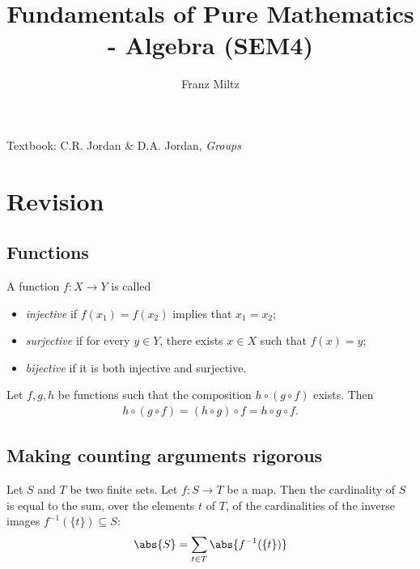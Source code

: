 \documentclass{article}
\begin{document}
\mkfpmthms
\title{Fundamentals of Pure Mathematics - Algebra (SEM4)}
\author{Franz Miltz}
\maketitle
\noindent Textbook: C.R. Jordan \& D.A. Jordan, \emph{Groups}
\tableofcontents
\pagebreak

\setcounter{section}{-1}


\section{Revision}


\subsection{Functions}

\begin{definition}
	A function $f:X\to Y$ is called
	\begin{itemize}
		\item \emph{injective} if $f(x_1)=f(x_2)$ implies that $x_1=x_2$;
		\item \emph{surjective} if for every $y\in Y$, there exists $x\in X$ such that $f(x)=y$;
		\item \emph{bijective} if it is both injective and surjective.
	\end{itemize}
\end{definition}

\begin{lemma}
	Let $f,g,h$ be functions such that the composition $h \circ (g \circ f)$ exists. Then
	\begin{align*}
		h \circ (g \circ f) = (h \circ g) \circ f = h \circ g \circ f.
	\end{align*}
\end{lemma}

\subsection{Making counting arguments rigorous}

\begin{theorem}
	Let $S$ and $T$ be two finite sets. Let $f:S\to T$ be a map.
	Then the cardinality of $S$ is equal to the sum, over the elements
	$t$ of $T$, of the cardinalities of the inverse images $f^{-1}(\{t\})\subseteq S$:
	\begin{align*}
		\abs{S} = \sum_{t\in T}\abs{f^{-1}(\{t\})}
	\end{align*}
\end{theorem}
\end{document}
